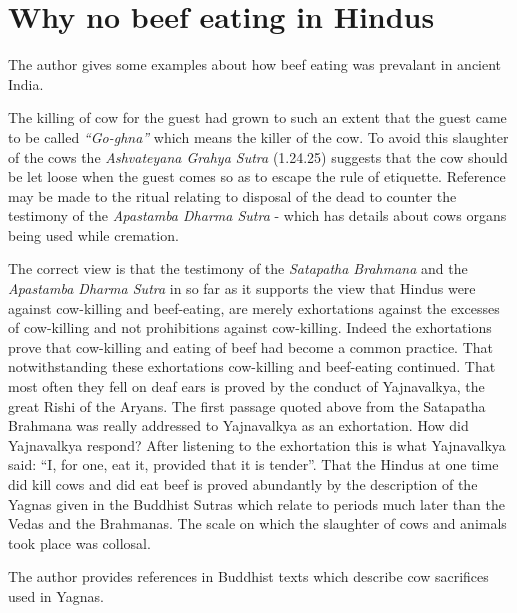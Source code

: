 \documentclass{article}
\begin{document}
\section{Why no beef eating in Hindus}
The author gives some examples about how beef eating was prevalant in ancient India.

\begin{shadequote}
The killing of cow for the guest had grown to such an extent that the guest came to be called \emph{``Go-ghna''} which means the killer of the cow. To avoid this slaughter of the cows the \emph{Ashvateyana Grahya Sutra} (1.24.25) suggests that the cow should be let loose when the guest comes so as to escape the rule of etiquette.
Reference may be made to the ritual relating to disposal of the dead to counter the testimony of the \emph{Apastamba Dharma Sutra} - which has details about cows organs being used while cremation.
\end{shadequote}

\begin{shadequote}
The correct view is that the testimony of the \emph{Satapatha Brahmana} and the \emph{Apastamba Dharma Sutra} in so far as it supports the view that Hindus were against cow-killing and beef-eating, are merely exhortations against the excesses of cow-killing and not prohibitions against cow-killing. Indeed the exhortations prove that cow-killing and eating of beef had become a common practice. That notwithstanding these exhortations cow-killing and beef-eating continued. That most often they fell on deaf ears is proved by the conduct of Yajnavalkya, the great Rishi of the Aryans. The first passage quoted above from the Satapatha Brahmana was really addressed to Yajnavalkya as an exhortation. How did Yajnavalkya respond? After listening to the exhortation this is what Yajnavalkya said: ``I, for one, eat it, provided that it is tender''.
That the Hindus at one time did kill cows and did eat beef is proved abundantly by the description of the Yagnas given in the Buddhist Sutras which relate to periods much later than the Vedas and the Brahmanas. The scale on which the slaughter of cows and animals took place was collosal.
\end{shadequote}

The author provides references in Buddhist texts which describe cow sacrifices used in Yagnas.
\end{document}
